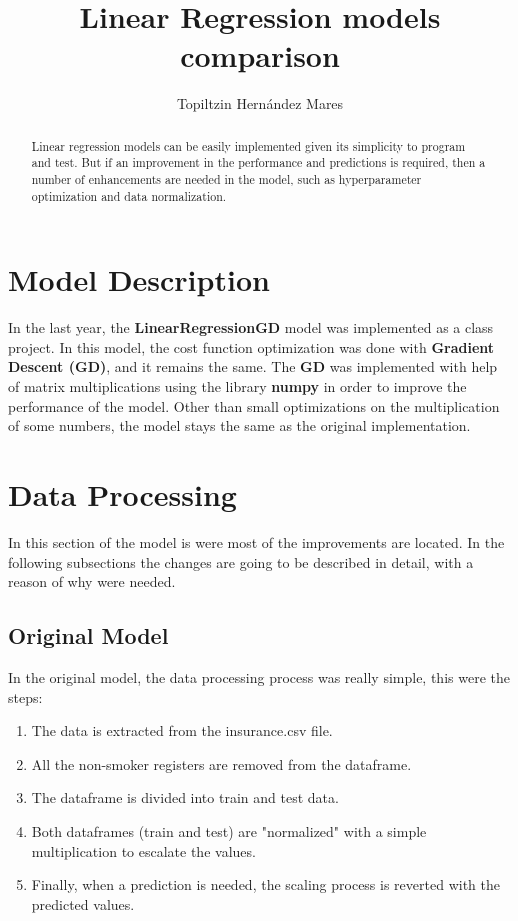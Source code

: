 \documentclass[11pt]{article}
\title{Linear Regression models comparison}
\author{Topiltzin Hernández Mares}
\begin{document}
\maketitle

\begin{abstract}
    Linear regression models can be easily implemented given its simplicity to program and test.
    But if an improvement in the performance and predictions is required, then a number of enhancements are needed in
    the model, such as hyperparameter optimization and data normalization.
\end{abstract}

\section{Model Description}\label{sec:model_description}
    In the last year, the \textbf{LinearRegressionGD} model was implemented as a class project.
    In this model, the cost function optimization was done with \textbf{Gradient Descent (GD)}, and it remains the same.
    The \textbf{GD} was implemented with help of matrix multiplications using the library \textbf{numpy} in order to
    improve the performance of the model.
    Other than small optimizations on the multiplication of some numbers, the model stays the same as the original
    implementation.

\section{Data Processing}\label{sec:data_processing}
In this section of the model is were most of the improvements are located. In the following subsections the changes are
going to be described in detail, with a reason of why were needed.

\subsection{Original Model}
    In the original model, the data processing process was really simple, this were the steps:
    \begin{enumerate}
        \item The data is extracted from the insurance.csv file.
        \item All the non-smoker registers are removed from the dataframe.
        \item The dataframe is divided into train and test data.
        \item Both dataframes (train and test) are "normalized" with a simple multiplication to escalate the values.
        \item Finally, when a prediction is needed, the scaling process is reverted with the predicted values.
    \end{enumerate}
\end{document}
